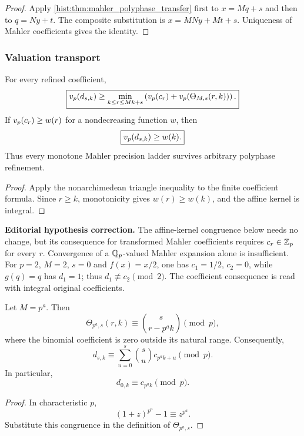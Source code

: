 \begin{proof}
Apply \cref{hist:thm:mahler_polyphase_transfer} first to \(x=Mq+s\) and then to \(q=Ny+t\). The composite substitution is \(x=MNy+Mt+s\). Uniqueness of Mahler coefficients gives the identity.
\end{proof}

\subsubsection{Valuation transport}

\begin{histtheorem}\label{hist:thm:polyphase_valuation_ledger}
For every refined coefficient,
\[
\boxed{
v_p(d_{s,k})
\geq
\min_{k\leq r\leq Mk+s}
\left(
v_p(c_r)+v_p(\Theta_{M,s}(r,k))
\right).
}
\]
If \(v_p(c_r)\geq w(r)\) for a nondecreasing function \(w\), then
\[
\boxed{v_p(d_{s,k})\geq w(k).}
\]
Thus every monotone Mahler precision ladder survives arbitrary polyphase refinement.
\end{histtheorem}

\begin{proof}
Apply the nonarchimedean triangle inequality to the finite coefficient formula. Since \(r\geq k\), monotonicity gives \(w(r)\geq w(k)\), and the affine kernel is integral.
\end{proof}

\begin{histtheorem}\label{hist:thm:prime_power_sparsification}
\par\noindent\textbf{Editorial hypothesis correction.} The affine-kernel congruence below needs no change, but its consequence for transformed Mahler coefficients requires $c_r\in\mathbb Z_p$ for every $r$. Convergence of a $\mathbb Q_p$-valued Mahler expansion alone is insufficient. For $p=2$, $M=2$, $s=0$ and $f(x)=x/2$, one has $c_1=1/2$, $c_2=0$, while $g(q)=q$ has $d_1=1$; thus $d_1\not\equiv c_2\pmod2$. The coefficient consequence is read with integral original coefficients.\par\medskip
Let \(M=p^a\). Then
\[
\boxed{
\Theta_{p^a,s}(r,k)
\equiv
\binom{s}{r-p^ak}
\pmod p,
}
\]
where the binomial coefficient is zero outside its natural range. Consequently,
\[
\boxed{
d_{s,k}
\equiv
\sum_{u=0}^{s}
\binom su
c_{p^ak+u}
\pmod p.
}
\]
In particular,
\[
\boxed{d_{0,k}\equiv c_{p^ak}\pmod p.}
\]
\end{histtheorem}

\begin{proof}
In characteristic \(p\),
\[
(1+z)^{p^a}-1\equiv z^{p^a}.
\]
Substitute this congruence in the definition of \(\Theta_{p^a,s}\).
\end{proof}

